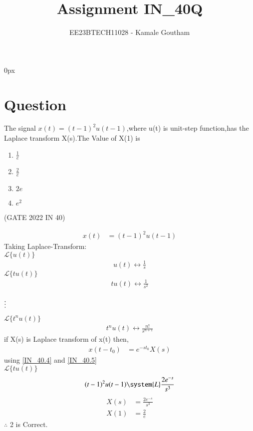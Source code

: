 \documentclass[journal,12pt,twocolumn]{IEEEtran}
\theoremstyle{remark}
\begin{document}
\parindent 0px

\title{Assignment IN\_40Q}
\author{EE23BTECH11028 - Kamale Goutham$^{}$%
}
\maketitle
\newpage
\bigskip
\section*{Question}
The signal $x(t)=(t-1)^2u(t-1)$,where u(t) is unit-step function,has the Laplace transform X(s).The Value of X(1) is 
\begin{enumerate}
    \item $\frac{1}{e}$
    \item $\frac{2}{e}$
    \item $2e$
    \item $e^2$
\end{enumerate}
\hfill{(GATE 2022 IN 40)}\\
\solution

\begin{align}
    x(t)&=(t-1)^2u(t-1) 
\end{align}
  Taking Laplace-Transform:\\
  
  $\mathcal{L}\{u(t)\}$
\begin{align}
    u(t) \leftrightarrow \frac{1}{s}  
\end{align}
    $\mathcal{L}\{tu(t)\}$ 
\begin{align}
    tu(t) \leftrightarrow \frac{1}{s^2}
\end{align}
\begin{center}
     $ \vdots \notag$ \\
\end{center}
  $\mathcal{L}\{t^nu(t)\}$ 
\begin{align}
    t^nu(t) \leftrightarrow \frac{n!}{s^{n+1}} \label{IN_40.4}
\end{align}
if X(s) is Laplace transform of x(t) then,\\
\begin{align}
  x(t-t_0)&=e^{-st_0}X(s)\label{IN_40.5}
\end{align}
using \ref{IN_40.4} and \ref{IN_40.5}\\
 $\mathcal{L}\{tu(t)\}$ 
\begin{align}
    (t-1)^2u(t-1) \system{L} \frac{2e^{-s}}{s^3}
\end{align}
\begin{align}
    X(s)&=\frac{2e^{-s}}{s^3}\\
    X(1)&=\frac{2}{e}
\end{align}
$\therefore$ 2 is Correct.
\end{document}
